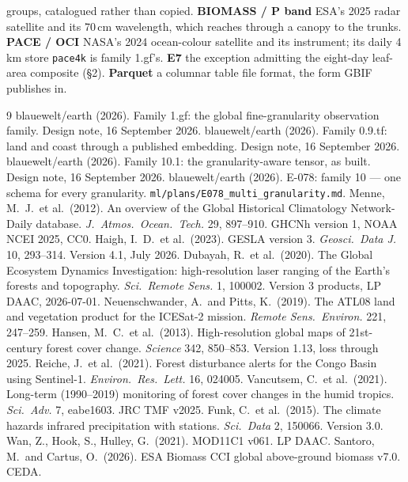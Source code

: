 \documentclass[10pt]{article}
\newcommand{\code}[1]{\texttt{#1}}
\begin{document}
groups, catalogued rather than copied. \textbf{BIOMASS / P band} ESA's 2025 radar satellite and its 70\,cm wavelength, which reaches through a canopy to the trunks. \textbf{PACE / OCI} NASA's 2024 ocean-colour satellite and its instrument; its daily 4\,km store \code{pace4k} is family 1.gf's. \textbf{E7} the exception admitting the eight-day leaf-area composite (\S2). \textbf{Parquet} a columnar table file format, the form GBIF publishes in.
\normalsize

\begin{thebibliography}{9}\small
{} blauewelt/earth (2026). Family 1.gf: the global fine-granularity observation family. Design note, 16 September 2026.
 blauewelt/earth (2026). Family 0.9.tf: land and coast through a published embedding. Design note, 16 September 2026.
 blauewelt/earth (2026). Family 10.1: the granularity-aware tensor, as built. Design note, 16 September 2026.
 blauewelt/earth (2026). E-078: family 10 --- one schema for every granularity. \code{ml/plans/E078\_multi\_granularity.md}.
 Menne, M.\ J.\ et al.\ (2012). An overview of the Global Historical Climatology Network-Daily database. \emph{J.\ Atmos.\ Ocean.\ Tech.} 29, 897--910. GHCNh version 1, NOAA NCEI 2025, CC0.
 Haigh, I.\ D.\ et al.\ (2023). GESLA version 3. \emph{Geosci.\ Data J.} 10, 293--314. Version 4.1, July 2026.
 Dubayah, R.\ et al.\ (2020). The Global Ecosystem Dynamics Investigation: high-resolution laser ranging of the Earth's forests and topography. \emph{Sci.\ Remote Sens.} 1, 100002. Version 3 products, LP DAAC, 2026-07-01.
 Neuenschwander, A.\ and Pitts, K.\ (2019). The ATL08 land and vegetation product for the ICESat-2 mission. \emph{Remote Sens.\ Environ.} 221, 247--259.
 Hansen, M.\ C.\ et al.\ (2013). High-resolution global maps of 21st-century forest cover change. \emph{Science} 342, 850--853. Version 1.13, loss through 2025.
 Reiche, J.\ et al.\ (2021). Forest disturbance alerts for the Congo Basin using Sentinel-1. \emph{Environ.\ Res.\ Lett.} 16, 024005.
 Vancutsem, C.\ et al.\ (2021). Long-term (1990--2019) monitoring of forest cover changes in the humid tropics. \emph{Sci.\ Adv.} 7, eabe1603. JRC TMF v2025.
 Funk, C.\ et al.\ (2015). The climate hazards infrared precipitation with stations. \emph{Sci.\ Data} 2, 150066. Version 3.0.
 Wan, Z., Hook, S., Hulley, G.\ (2021). MOD11C1 v061. LP DAAC.
 Santoro, M.\ and Cartus, O.\ (2026). ESA Biomass CCI global above-ground biomass v7.0. CEDA.

\end{thebibliography}
\end{document}

